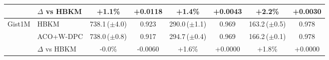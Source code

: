 \begin{table}[t]
{\begin{tabular}{llcccccc}
 & \quad$\Delta$ vs HBKM & +1.1\% & +0.0118 & +1.4\% & +0.0043 & +2.2\% & +0.0030 \\
\midrule
\multirow{3}{*}{Gist1M} & HBKM & 738.1\,{\scriptsize($\pm$4.0)} & 0.923 & 290.0\,{\scriptsize($\pm$1.1)} & 0.969 & 163.2\,{\scriptsize($\pm$0.5)} & 0.978 \\
 & ACO+W-DPC & 738.0\,{\scriptsize($\pm$0.8)} & 0.917 & 294.7\,{\scriptsize($\pm$0.4)} & 0.969 & 166.2\,{\scriptsize($\pm$0.1)} & 0.978 \\
 & \quad$\Delta$ vs HBKM & -0.0\% & -0.0060 & +1.6\% & +0.0000 & +1.8\% & +0.0000 \\
\midrule
\bottomrule
\end{tabular}}
\end{table}
